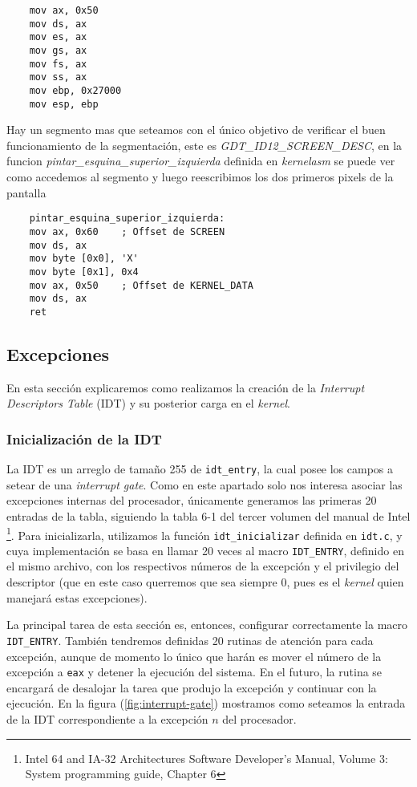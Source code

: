 \begin{lstlisting}
	mov ax, 0x50	
	mov ds, ax
	mov es, ax
	mov gs, ax
	mov fs, ax
	mov ss, ax
	mov ebp, 0x27000
	mov esp, ebp
\end{lstlisting}

Hay un segmento mas que seteamos con el único objetivo de verificar el buen funcionamiento de la segmentación, este es \textit{GDT\_ID12\_SCREEN\_DESC}, en la funcion \textit{pintar\_esquina\_superior\_izquierda} definida en \textit{kernelasm} se puede ver como accedemos al segmento y luego reescribimos los dos primeros pixels de la pantalla

\begin{lstlisting}
	pintar_esquina_superior_izquierda:
	mov ax, 0x60	; Offset de SCREEN
	mov ds, ax
	mov byte [0x0], 'X'
	mov byte [0x1], 0x4
	mov ax, 0x50	; Offset de KERNEL_DATA
	mov ds, ax
	ret	
\end{lstlisting}

\subsection{Excepciones}
\label{subsec:excepciones}
En esta sección explicaremos como realizamos la creación de la \textit{Interrupt Descriptors Table} (IDT) y su posterior carga en el \textit{kernel}.

\subsubsection{Inicialización de la IDT}
La IDT es un arreglo de tamaño 255 de \texttt{idt\_entry}, la cual posee los campos a setear de una \textit{interrupt gate}. Como en este apartado solo nos interesa asociar las excepciones internas del procesador, únicamente generamos las primeras 20 entradas de la tabla, siguiendo la tabla 6-1 del tercer volumen del manual de Intel \footnote{Intel 64 and IA-32 Architectures Software Developer's Manual, Volume 3: System programming guide, Chapter 6}. Para inicializarla, utilizamos la función \texttt{idt\_inicializar} definida en \texttt{idt.c}, y cuya implementación se basa en llamar 20 veces al macro \texttt{IDT\_ENTRY}, definido en el mismo archivo, con los respectivos números de la excepción y el privilegio del descriptor (que en este caso querremos que sea siempre 0, pues es el \textit{kernel} quien manejará estas excepciones).

La principal tarea de esta sección es, entonces, configurar correctamente la macro \texttt{IDT\_ENTRY}. También tendremos definidas 20 rutinas de atención para cada excepción, aunque de momento lo único que harán es mover el número de la excepción a \texttt{eax} y detener la ejecución del sistema. En el futuro, la rutina se encargará de desalojar la tarea que produjo la excepción y continuar con la ejecución.
En la figura (\ref{fig:interrupt-gate}) mostramos como seteamos la entrada de la IDT correspondiente a la excepción $n$ del procesador.
\vspace{1em}

